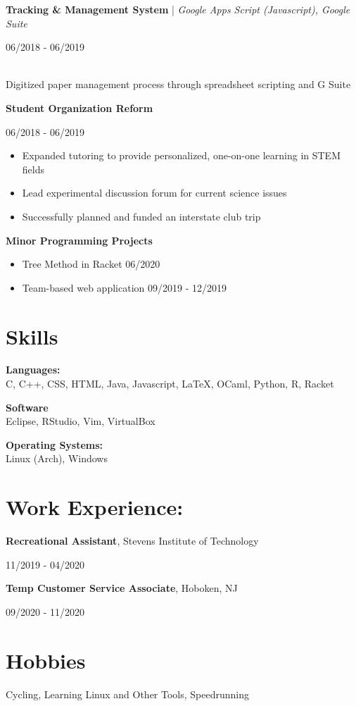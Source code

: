 \documentclass[11pt,letterpaper]{article}
\begin{document}
    \textbf{Tracking \& Management System} | \textit{Google Apps Script (Javascript), Google Suite}\hfill
      \begin{minipage}[t]{1.2in}
        06/2018 - 06/2019
      \end{minipage} \\
      Digitized paper management process through spreadsheet scripting and G Suite
    
    \textbf{Student Organization Reform}\hfill
      \begin{minipage}[t]{1.2in}
        06/2018 - 06/2019
      \end{minipage} 
      
      \begin{itemize}
        \item Expanded tutoring to provide personalized, one-on-one learning in STEM fields
        \item Lead experimental discussion forum for current science issues
        \item Successfully planned and funded an interstate club trip
      \end{itemize}
    
    \textbf{Minor Programming Projects}\hfill
    \begin{itemize}
      \item Tree Method in Racket \hfill 06/2020
      \item Team-based web application \hfill 09/2019 - 12/2019
    \end{itemize}
    

  \section{Skills}
    \textbf{Languages:}\\
    C, C++, CSS, HTML, Java, Javascript, LaTeX, OCaml, Python, R, Racket
    
    \begin{minipage}[t]{2.5in}
      \textbf{Software}\\
      Eclipse, RStudio, Vim, VirtualBox
    \end{minipage}\hfill
    \begin{minipage}[t]{1.6in}
      \textbf{Operating Systems:}\\
      Linux (Arch), Windows
    \end{minipage}
    
  \section{Work Experience:}
    \textbf{Recreational Assistant}, Stevens Institute of Technology\hfill
    \begin{minipage}[t]{1.2in}
      11/2019 - 04/2020
    \end{minipage}
    
    \textbf{Temp Customer Service Associate}, Hoboken, NJ \hfill
    \begin{minipage}[t]{1.2in}
      09/2020 - 11/2020
    \end{minipage}
    
  \section{Hobbies}
    Cycling, Learning Linux and Other Tools, Speedrunning
    
\end{document}
